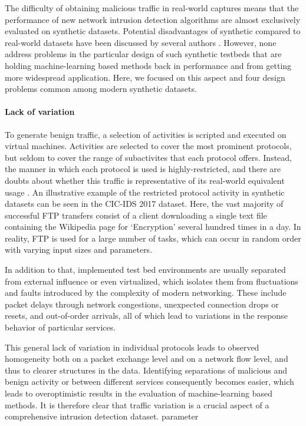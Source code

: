 \documentclass[sigconf]{acmart}
\begin{document}
The difficulty of obtaining malicious traffic in real-world captures means that the performance of new network intrusion detection algorithms are almost exclusively evaluated on synthetic datasets. Potential disadvantages of synthetic compared to real-world datasets have been discussed by several authors \cite{sommer2010outside,sperotto2009labeled}. However, none address problems in the particular design of such synthetic testbeds that are holding machine-learning based methods back in performance and from getting more widespread application. Here, we focused on this aspect and four design problems common among modern synthetic datasets.


\paragraph{Lack of variation}\label{Sec:lackvar}

To generate benign traffic, a selection of activities is scripted and executed on virtual machines. Activities are selected to cover the most prominent protocols, but seldom to cover the range of subactivites that each protocol offers. Instead, the manner in which each protocol is used is highly-restricted, and there are doubts about whether this traffic is representative of its real-world equivalent usage \cite{sommer2010outside}. 
An illustrative example of the restricted protocol activity in synthetic datasets can be seen in the CIC-IDS 2017 dataset. Here, the vast majority of successful FTP transfers consist of a client downloading a single text file containing the Wikipedia page for `Encryption' several hundred times in a day. In reality, FTP is used for a large number of tasks, which can occur in random order with varying input sizes and parameters. 

In addition to that, implemented test bed environments are usually separated from external influence or even virtualized, which isolates them from fluctuations and faults introduced by the complexity of modern networking. These include packet delays through network congestions, unexpected connection drops or resets, and out-of-order arrivals, all of which lead to variations in the response behavior of particular services.

This general lack of variation in individual protocols leads to observed homogeneity both on a packet exchange level and on a network flow level, and thus to clearer structures in the data. Identifying separations of malicious and benign activity or between different services consequently becomes easier, which leads to overoptimistic results in the evaluation of machine-learning based methods. It is therefore clear that traffic variation is a crucial aspect of a comprehensive intrusion detection dataset.
parameter
\end{document}
